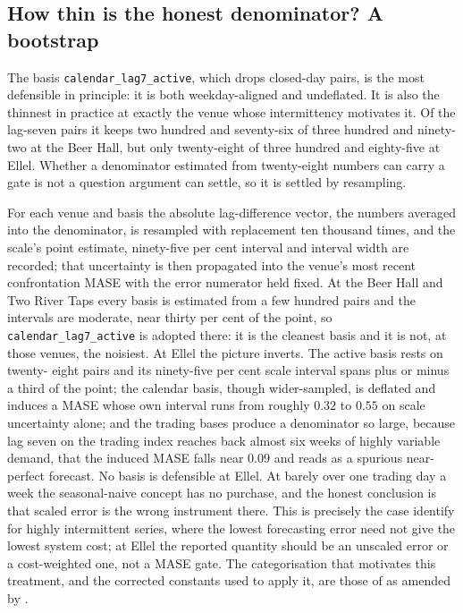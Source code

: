 \subsection{How thin is the honest denominator? A bootstrap}
\label{sec:ruler-bootstrap}

The basis \texttt{calendar\_lag7\_active}, which drops closed-day pairs, is the most
defensible in principle: it is both weekday-aligned and undeflated. It is also the thinnest
in practice at exactly the venue whose intermittency motivates it. Of the lag-seven pairs it
keeps two hundred and seventy-six of three hundred and ninety-two at the Beer Hall, but only
twenty-eight of three hundred and eighty-five at Ellel. Whether a denominator estimated from
twenty-eight numbers can carry a gate is not a question argument can settle, so it is settled
by resampling.

For each venue and basis the absolute lag-difference vector, the numbers averaged into the
denominator, is resampled with replacement ten thousand times, and the scale's point
estimate, ninety-five per cent interval and interval width are recorded; that uncertainty is
then propagated into the venue's most recent confrontation MASE with the error numerator held
fixed. At the Beer Hall and Two River Taps every basis is estimated from a few hundred pairs
and the intervals are moderate, near thirty per cent of the point, so
\texttt{calendar\_lag7\_active} is adopted there: it is the cleanest basis and it is not, at
those venues, the noisiest. At Ellel the picture inverts. The active basis rests on twenty-
eight pairs and its ninety-five per cent scale interval spans plus or minus a third of the
point; the calendar basis, though wider-sampled, is deflated and induces a MASE whose own
interval runs from roughly $0.32$ to $0.55$ on scale uncertainty alone; and the trading bases
produce a denominator so large, because lag seven on the trading index reaches back almost
six weeks of highly variable demand, that the induced MASE falls near $0.09$ and reads as a
spurious near-perfect forecast. No basis is defensible at Ellel. At barely over one trading
day a week the seasonal-naive concept has no purchase, and the honest conclusion is that
scaled error is the wrong instrument there. This is precisely the case \citet{chatfield_all-zero_2007}
identify for highly intermittent series, where the lowest forecasting error need not give the
lowest system cost; at Ellel the reported quantity should be an unscaled error or a
cost-weighted one, not a MASE gate. The categorisation that motivates this treatment, and the
corrected constants used to apply it, are those of \citet{syntetos_categorization_2005} as
amended by \citet{kostenko_note_2006}.

